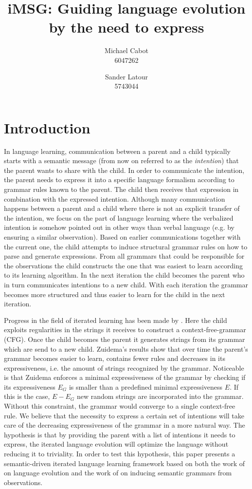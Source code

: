 \documentclass[a4paper]{article}
\title{iMSG: Guiding language evolution by the need to express}
\author{Michael Cabot\\6047262 \and Sander Latour\\5743044}
\begin{document}
\maketitle
\section{Introduction}
\cite{zuidema2003poverty} \cite{batali1999negotiation}
In language learning, communication between a parent and a child typically starts with a semantic message (from now on referred to as the \emph{intention}) that the parent wants to share with the child. In order to communicate the intention, the parent needs to express it into a specific language formalism according to grammar rules known to the parent. The child then receives that expression in combination with the expressed intention. Although many communication happens between a parent and a child where there is not an explicit transfer of the intention, we focus on the part of language learning where the verbalized intention is somehow pointed out in other ways than verbal language (e.g. by ensuring a similar observation). Based on earlier communications together with the current one, the child attempts to induce structural grammar rules on how to parse and generate expressions. From all grammars that could be responsible for the observations the child constructs the one that was easiest to learn according to its learning algorithm.  In the next iteration the child becomes the parent who in turn communicates intentions to a new child. With each iteration the grammar becomes more structured and thus easier to learn for the child in the next iteration. 

Progress in the field of iterated learning has been made by \cite{zuidema2003poverty}. Here the child exploits regularities in the strings it receives to construct a context-free-grammar (CFG). Once the child becomes the parent it generates strings from its grammar which are send to a new child. Zuidema's results show that over time the parent's grammar becomes easier to learn, contains fewer rules and decreases in its expressiveness, i.e. the amount of strings recognized by the grammar. Noticeable is that Zuidema enforces a minimal expressiveness of the grammar by checking if its expressiveness $E_G$ is smaller than a predefined minimal expressiveness $E$. If this is the case, $E - E_G$ new random strings are incorporated into the grammar. Without this constraint, the grammar would converge to a single context-free rule. We believe that the necessity to express a certain set of intentions will take care of the decreasing expressiveness of the grammar in a more natural way. The hypothesis is that by providing the parent with a list of intentions it needs to express, the iterated language evolution will optimize the language without reducing it to triviality. In order to test this hypothesis, this paper presents a semantic-driven iterated language learning framework based on both the work of \cite{zuidema2003poverty} on language evolution and the work of \cite{batali1999negotiation} on inducing semantic grammars from observations.
\end{document}

